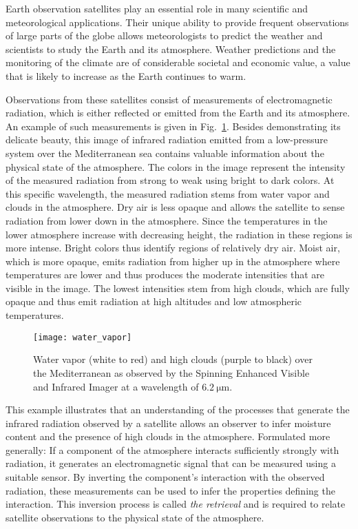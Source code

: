 
Earth observation satellites play an essential role in many scientific and
meteorological applications. Their unique ability to provide frequent
observations of large parts of the globe allows meteorologists to predict the
weather and scientists to study the Earth and its atmosphere. Weather
predictions and the monitoring of the climate are of considerable
societal and economic value, a value that is likely to increase as the 
Earth continues to warm.

Observations from these satellites consist of measurements of electromagnetic
radiation, which is either reflected or emitted from the Earth and its
atmosphere. An example of such measurements is given in
Fig.~\ref{fig:introduction:water_vapor}. Besides demonstrating its delicate
beauty, this image of infrared radiation emitted from a low-pressure system over
the Mediterranean sea contains valuable information about the physical state of
the atmosphere. The colors in the image represent the intensity of the measured
radiation from strong to weak using bright to dark colors. At this specific
wavelength, the measured radiation stems from water vapor and clouds in the
atmosphere. Dry air is less opaque and allows the satellite to sense
radiation from lower down in the atmosphere. Since the temperatures in the lower
atmosphere increase with decreasing height, the radiation in these regions is
more intense. Bright colors thus identify regions of relatively dry air. Moist
air, which is more opaque, emits radiation from higher up in the atmosphere
where temperatures are lower and thus produces the moderate intensities that are visible in the
image. The lowest intensities stem from high clouds, which are fully opaque and
thus emit radiation at high altitudes and low atmospheric temperatures.

\begin{figure}[h!]
\centering
\texttt{[image: water\_vapor]}
\caption{Water vapor (white to red) and high clouds (purple to black) over the
Mediterranean as observed by the Spinning Enhanced Visible and Infrared
Imager at a wavelength of $\SI{6.2}{\micro \meter}$.}
\label{fig:introduction:water_vapor}
\end{figure}

This example illustrates that an understanding of the processes that generate
the infrared radiation observed by a satellite allows an observer to infer
moisture content and the presence of high clouds in the atmosphere.
Formulated more generally: If a component of the atmosphere interacts
sufficiently strongly with radiation, it generates an electromagnetic signal
that can be measured using a suitable sensor. By inverting the component's
interaction with the observed radiation, these measurements can be used to infer
the properties defining the interaction. This inversion process is
called \textit{the retrieval} and is required to relate satellite observations
to the physical state of the atmosphere.

